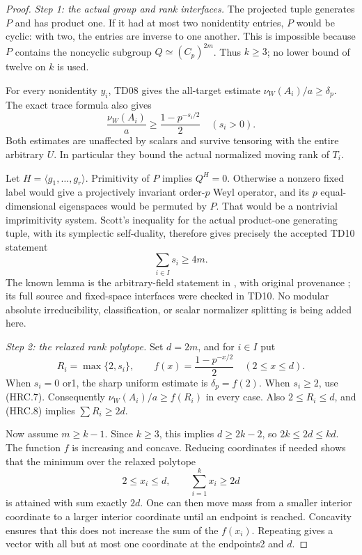 \begin{proof}
\emph{Step 1: the actual group and rank interfaces.}
The projected tuple generates \(P\) and has product one.
If it had at most two nonidentity entries, \(P\) would be cyclic:
with two, the entries are inverse to one another.  This is impossible
because \(P\) contains the noncyclic subgroup
\(Q\simeq(C_p)^{2m}\).  Thus \(k\ge3\); no lower bound of twelve
on \(k\) is used.

For every nonidentity \(y_i\), TD08 gives the all-target estimate
\(\nu_W(A_i)/a\ge\delta_p\).  The exact trace formula also gives
\[
 \frac{\nu_W(A_i)}a\ge
    \frac{1-p^{-s_i/2}}2\quad(s_i>0).
 \tag{HRC.7}
\]
Both estimates are unaffected by scalars and survive tensoring with
the entire arbitrary \(U\).  In particular they bound the actual
normalized moving rank of \(T_i\).

Let \(H=\langle g_1,\ldots,g_r\rangle\).  Primitivity of \(P\)
implies \(Q^H=0\).  Otherwise a nonzero fixed label would give
a projectively invariant order-\(p\) Weyl operator, and its \(p\)
equal-dimensional eigenspaces would be permuted by \(P\).
That would be a nontrivial imprimitivity system.
Scott's inequality for the actual product-one generating tuple,
with its symplectic self-duality, therefore gives precisely the
accepted TD10 statement
\[
                      \sum_{i\in I}s_i\ge4m.
 \tag{HRC.8}
\]
The known lemma is the arbitrary-field statement in
\cite[Lemma 2.3, author version p.~7]{TD:GuralnickMaroti2011},
with original provenance \cite{TD:Scott1977}; its full source and
fixed-space interfaces were checked in TD10.
No modular absolute irreducibility, classification, or scalar
normalizer splitting is being added here.

\emph{Step 2: the relaxed rank polytope.}
Set \(d=2m\), and for \(i\in I\) put
\[
 R_i=\max\{2,s_i\},\qquad
 f(x)=\frac{1-p^{-x/2}}2\quad(2\le x\le d).
 \tag{HRC.9}
\]
When \(s_i=0\) or1, the sharp uniform estimate is
\(\delta_p=f(2)\).  When \(s_i\ge2\), use (HRC.7).
Consequently \(\nu_W(A_i)/a\ge f(R_i)\) in every case.
Also \(2\le R_i\le d\), and (HRC.8) implies
\(\sum R_i\ge2d\).

Now assume \(m\ge k-1\).  Since \(k\ge3\), this implies
\(d\ge2k-2\), so \(2k\le2d\le kd\).
The function \(f\) is increasing and concave.  Reducing coordinates
if needed shows that the minimum over the relaxed polytope
\[
          2\le x_i\le d,\qquad \sum_{i=1}^k x_i\ge2d
 \tag{HRC.10}
\]
is attained with sum exactly \(2d\).
One can then move mass from a smaller interior coordinate to a
larger interior coordinate until an endpoint is reached.  Concavity
ensures that this does not increase the sum of the \(f(x_i)\).
Repeating gives a vector with all but at most one coordinate at
the endpoints2 and \(d\).


\end{proof}
